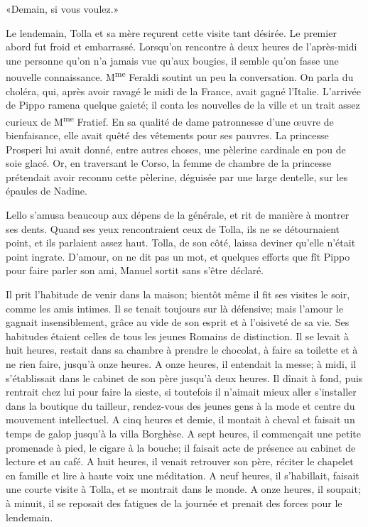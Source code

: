 «Demain, si vous voulez.»

Le lendemain, Tolla et sa mère reçurent cette visite tant désirée. Le
premier abord fut froid et embarrassé. Lorsqu'on rencontre à deux heures
de l'après-midi une personne qu'on n'a jamais vue qu'aux bougies, il
semble qu'on fasse une nouvelle connaissance. M\textsuperscript{me}
Feraldi soutint un peu la conversation. On parla du choléra, qui, après
avoir ravagé le midi de la France, avait gagné l'Italie. L'arrivée de
Pippo ramena quelque gaieté; il conta les nouvelles de la ville et un
trait assez curieux de M\textsuperscript{me} Fratief. En sa qualité de
dame patronnesse d'une œuvre de bienfaisance, elle avait quêté des
vêtements pour ses pauvres. La princesse Prosperi lui avait donné, entre
autres choses, une pèlerine cardinale en pou de soie glacé. Or, en
traversant le Corso, la femme de chambre de la princesse prétendait
avoir reconnu cette pèlerine, déguisée par une large dentelle, sur les
épaules de Nadine.

Lello s'amusa beaucoup aux dépens de la générale, et rit de manière à
montrer ses dents. Quand ses yeux rencontraient ceux de Tolla, ils ne se
détournaient point, et ils parlaient assez haut. Tolla, de son côté,
laissa deviner qu'elle n'était point ingrate. D'amour, on ne dit pas un
mot, et quelques efforts que fît Pippo pour faire parler son ami, Manuel
sortit sans s'être déclaré.

Il prit l'habitude de venir dans la maison; bientôt même il fit ses
visites le soir, comme les amis intimes. Il se tenait toujours sur là
défensive; mais l'amour le gagnait insensiblement, grâce au vide de son
esprit et à l'oisiveté de sa vie. Ses habitudes étaient celles de tous
les jeunes Romains de distinction. Il se levait à huit heures, restait
dans sa chambre à prendre le chocolat, à faire sa toilette et à ne rien
faire, jusqu'à onze heures. A onze heures, il entendait la messe; à
midi, il s'établissait dans le cabinet de son père jusqu'à deux heures.
Il dînait à fond, puis rentrait chez lui pour faire la sieste, si
toutefois il n'aimait mieux aller s'installer dans la boutique du
tailleur, rendez-vous des jeunes gens à la mode et centre du mouvement
intellectuel. A cinq heures et demie, il montait à cheval et faisait un
temps de galop jusqu'à la villa Borghèse. A sept heures, il commençait
une petite promenade à pied, le cigare à la bouche; il faisait acte de
présence au cabinet de lecture et au café. A huit heures, il venait
retrouver son père, réciter le chapelet en famille et lire à haute voix
une méditation. A neuf heures, il s'habillait, faisait une courte visite
à Tolla, et se montrait dans le monde. A onze heures, il soupait; à
minuit, il se reposait des fatigues de la journée et prenait des forces
pour le lendemain.

